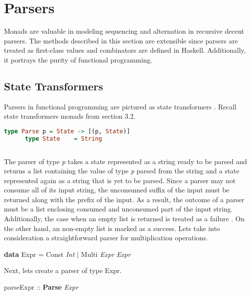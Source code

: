 \documentclass[a4paper, onecolumn]{article}
\begin{document}
    
    
    \section{Parsers}
    Monads are valuable in modeling sequencing and alternation in recursive decent parsers. The methods described in this section are extensible since parsers are treated as first-class values and combinators are defined in Haskell. Additionally, it portrays the purity of functional programming.
    
    \subsection{State Transformers}
    
    Parsers in functional programming are pictured as state transformers \cite{original}. Recall state transformers monads from section 3.2.  
    
    \begin{tcolorbox}
      \begin{lstlisting}[language=Haskell]
      type Parse p = State -> [(p, State)]
      type State    = String  
      
      \end{lstlisting}
    \end{tcolorbox}
    
    The parser of type \textit{p} takes a state represented as a string ready to be parsed and returns a list containing the value of type \textit{p} parsed from the string and a state represented again as a string that is yet to be parsed. Since a parser may not consume all of its input string, the unconsumed suffix of the input must be returned along with the prefix of the input. As a result, the outcome of a parser must be a list enclosing consumed and unconsumed part of the input string. Additionally, the case when an empty list is returned is treated as a failure \cite{pearls}. On the other hand, an non-empty list is marked as a success. Lets take into consideration a straightforward parser for multiplication operations.
    
    \begin{center}
        \textbf{data} Expr = Const \textit{Int} $\vert$ Multi \textit{Expr} \textit{Expr} 
    \end{center}
    
    Next, lets create a parser of type Expr. 
    
    \begin{center}
        parseExpr :: \textbf{Parse} \textit{Expr} 
    \end{center}
    
\end{document}

